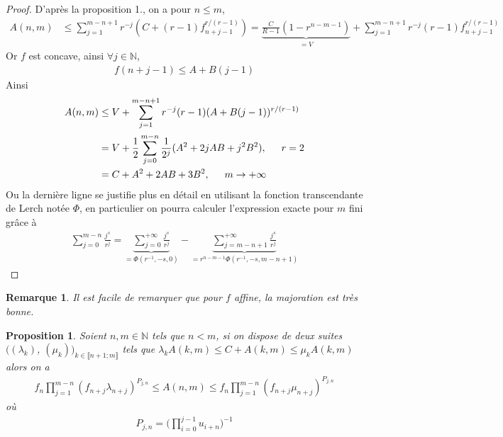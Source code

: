 \documentclass{article}
\newtheorem{prop}{Proposition}
\newtheorem*{remark}{Remarque}
\begin{document}
\begin{proof}
D'après la proposition 1., on a pour $n\leq m$,
\begin{align*}
A(n,m)& \leq \sum_{j=1}^{m-n+1}r^{-j}(C+(r-1)f_{n+j-1}^{r/(r-1)})=\underbrace{ \frac{C}{R-1}(1-r^{n-m-1})}_{=V}+\sum_{j=1}^{m-n+1}{r^{-j}(r-1)f_{n+j-1}^{r/(r-1)}}
\end{align*}
Or $f$ est concave, ainsi $\forall j\in\mathbb{N}$, 
\begin{align*}
f(n+j-1)\leq A+B(j-1)
\end{align*}
Ainsi
\begin{align*}
A(n,m)&\leq V+\sum_{j=1}^{m-n+1}{r^{-j}(r-1)(A+B(j-1))^{r/(r-1)}}\\
&= V+\frac{1}{2}\sum_{j=0}^{m-n} {\frac{1}{2^j}(A^2+2jAB+j^2B^2)}, \indent r = 2\\
& = C+A^2+2AB+3B^2, \indent m \to +\infty
\end{align*}
Ou la dernière ligne se justifie plus en détail en utilisant la fonction transcendante de Lerch notée $\Phi$, en particulier on pourra calculer l'expression exacte pour $m$ fini grâce à
\begin{align*}
\sum_{j=0}^{m-n} \frac{j^s}{r^j}=\underbrace{\sum_{j=0}^{+\infty}\frac{j^s}{r^j}}_{=\Phi(r^{-1},-s,0)}-\underbrace{\sum_{j=m-n+1}^{+\infty}{\frac{j^s}{r^j}}}_{=r^{n-m-1}\Phi(r^{-1},-s,m-n+1)}
\end{align*}
\end{proof}
\begin{remark}
Il est facile de remarquer que pour $f$ affine, la majoration est très bonne.
\end{remark}
\begin{prop}
Soient $n,m\in\mathbb{N}$ tels que $n<m$, si on dispose de deux suites $((\lambda_k)$, $(\mu_k))_{k\in\llbracket n+1;m\rrbracket}$ tels que $\lambda_kA(k,m)\leq C+A(k,m)\leq \mu_k A(k,m)$ alors on a 
\begin{align*}
f_n\prod_{j=1}^{m-n}{(f_{n+j}\lambda_{n+j})^{P_{j,n}}}  \leq A(n,m)\leq f_n\prod_{j=1}^{m-n}(f_{n+j}\mu_{n+j})^{P_{j,n}}
\end{align*} 
où 
\begin{align*}
P_{j,n} = \bigg(\prod_{i=0}^{j-1}{u_{i+n}}\bigg)^{-1}
\end{align*}
\end{prop}
\end{document}
